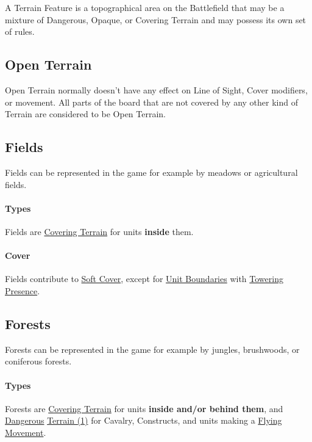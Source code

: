 A Terrain Feature is a topographical area on the Battlefield that may be a mixture of Dangerous, Opaque, or Covering Terrain and may possess its own set of rules.

\subsection{Open Terrain}
\label{open_terrain}

Open Terrain normally doesn't have any effect on Line of Sight, Cover modifiers, or movement. All parts of the board that are not covered by any other kind of Terrain are considered to be Open Terrain.

\subsection{Fields}
\label{fields}

Fields can be represented in the game for example by meadows or agricultural fields.

\paragraph{Types}

Fields are \hyperref[covering_terrain]{Covering Terrain} for units \textbf{inside} them.

\paragraph{Cover}

Fields contribute to \hyperref[covering_terrain]{Soft Cover}, except for \hyperref[boundary_rectangle]{Unit Boundaries} with \hyperref[towering_presence]{Towering Presence}.

\subsection{Forests}
\label{forests}

Forests can be represented in the game for example by jungles, brushwoods, or coniferous forests.

\paragraph{Types}

Forests are \hyperref[covering_terrain]{Covering Terrain} for units \textbf{inside and/or behind them}, and \hyperref[dangerous_terrain]{Dangerous} \hyperref[dangerous_terrain]{Terrain (1)} for Cavalry, Constructs, and units making a \hyperref[fly]{Flying Movement}.

